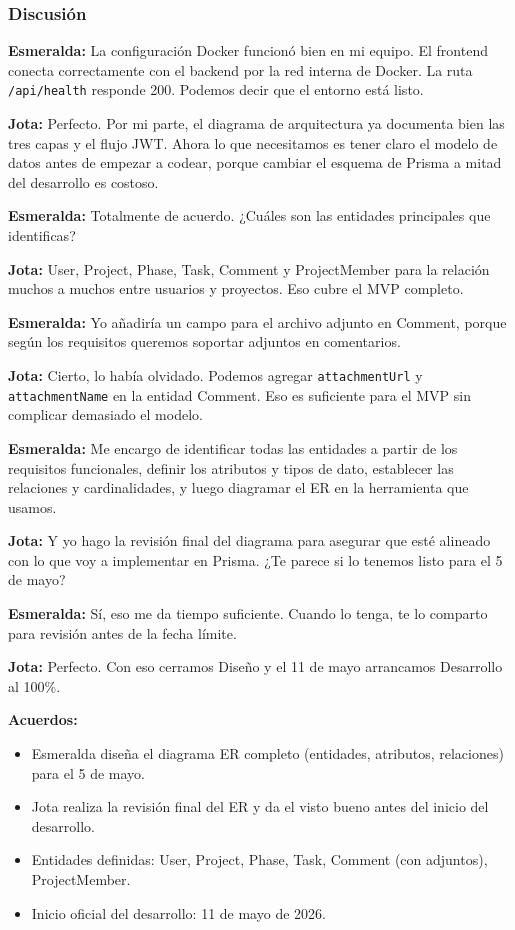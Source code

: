\documentclass[12pt, a4paper]{article}
\newcommand{\jota}[1]{\noindent\textbf{\color{primary}Jota:} #1\par\smallskip}
\newcommand{\esme}[1]{\noindent\textbf{\color{accentgreen}Esmeralda:} #1\par\smallskip}
\begin{document}
\subsubsection*{Discusión}

\esme{La configuración Docker funcionó bien en mi equipo. El frontend conecta correctamente con el backend por la red interna de Docker. La ruta \texttt{/api/health} responde 200. Podemos decir que el entorno está listo.}

\jota{Perfecto. Por mi parte, el diagrama de arquitectura ya documenta bien las tres capas y el flujo JWT. Ahora lo que necesitamos es tener claro el modelo de datos antes de empezar a codear, porque cambiar el esquema de Prisma a mitad del desarrollo es costoso.}

\esme{Totalmente de acuerdo. ¿Cuáles son las entidades principales que identificas?}

\jota{User, Project, Phase, Task, Comment y ProjectMember para la relación muchos a muchos entre usuarios y proyectos. Eso cubre el MVP completo.}

\esme{Yo añadiría un campo para el archivo adjunto en Comment, porque según los requisitos queremos soportar adjuntos en comentarios.}

\jota{Cierto, lo había olvidado. Podemos agregar \texttt{attachmentUrl} y \texttt{attachmentName} en la entidad Comment. Eso es suficiente para el MVP sin complicar demasiado el modelo.}

\esme{Me encargo de identificar todas las entidades a partir de los requisitos funcionales, definir los atributos y tipos de dato, establecer las relaciones y cardinalidades, y luego diagramar el ER en la herramienta que usamos.}

\jota{Y yo hago la revisión final del diagrama para asegurar que esté alineado con lo que voy a implementar en Prisma. ¿Te parece si lo tenemos listo para el 5 de mayo?}

\esme{Sí, eso me da tiempo suficiente. Cuando lo tenga, te lo comparto para revisión antes de la fecha límite.}

\jota{Perfecto. Con eso cerramos Diseño y el 11 de mayo arrancamos Desarrollo al 100\%.}

\begin{acuerdobox}
\textbf{Acuerdos:}
\begin{itemize}[leftmargin=1.2em, topsep=2pt]
  \item Esmeralda diseña el diagrama ER completo (entidades, atributos, relaciones) para el 5 de mayo.
  \item Jota realiza la revisión final del ER y da el visto bueno antes del inicio del desarrollo.
  \item Entidades definidas: User, Project, Phase, Task, Comment (con adjuntos), ProjectMember.
  \item Inicio oficial del desarrollo: 11 de mayo de 2026.
\end{itemize}
\end{acuerdobox}
\end{document}
